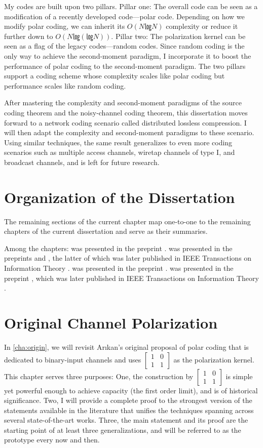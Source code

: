 \documentclass[openany]{amsbook}
\numberwithin{equation}{chapter}
\numberwithin{figure}{chapter}
\numberwithin{table}{chapter}
\def\loll{\bsm{1&0\\1&1}}
\def\bsm#1{[\begin{smallmatrix}#1\end{smallmatrix}]}
\theoremstyle{definition}	理dfn:Definition~?s			理exa:Example~?s
\theoremstyle{remark}		理cla:Claim~?s				理rem:Remark~?s
\begin{document}
	My codes are built upon two pillars.
	Pillar one:
	The overall code can be seen as a modification
	of a recently developed code---polar code.
	Depending on how we modify polar coding, we can inherit its
	$O(N㏒N)$ complexity or reduce it further down to $O(N㏒(㏒ N))$.
	Pillar two:
	The polarization kernel can be seen as a flag of the legacy codes---random codes.
	Since random coding is the only way to achieve the second-moment paradigm,
	I incorporate it to boost the performance of
	polar coding to the second-moment paradigm.
	The two pillars support a coding scheme whose
	complexity scales like polar coding but performance scales like random coding.
	
	After mastering the complexity and second-moment paradigms of
	the source coding theorem and the noisy-channel coding theorem,
	this dissertation moves forward to a network coding scenario
	called distributed lossless compression.
	I will then adapt the complexity and second-moment paradigms to these scenario.
	Using similar techniques, the same result generalizes to
	even more coding scenarios such as
	multiple access channels,
	wiretap channels of type I, and
	broadcast channels,
	and is left for future research.

\section{Organization of the Dissertation}

	The remaining sections of the current chapter map one-to-one to
	the remaining chapters of the current dissertation and serve as their summaries.
	
	Among the chapters:
	 was presented in the preprint \cite{ModerateDeviations18}.
	 was presented in the preprints \cite{LoglogTime18}
		and \cite{LoglogTime19}, the latter of which was later published in
		IEEE Transactions on Information Theory \cite{LoglogTime21}.
	 was presented in the preprint \cite{LargeDeviations18}.
	 was presented in the preprint \cite{Hypotenuse19}, which was later
		published in IEEE Transactions on Information Theory \cite{Hypotenuse21}.

\section{Original Channel Polarization}

	In \cref{cha:origin}, we will revisit Arıkan's original proposal
	of polar coding that is dedicated to binary-input channels
	and uses $\loll$ as the polarization kernel.
	This chapter serves three purposes:
	One, the construction by $\loll$ is simple yet powerful enough to achieve
	capacity (the first order limit), and is of historical significance.
	Two, I will provide a complete proof to the strongest version
	of the statements available in the literature that unifies
	the techniques spanning across several state-of-the-art works.
	Three, the main statement and its proof are the starting point of at least
	three generalizations, and will be referred to as the prototype every now and then.
	
\end{document}
